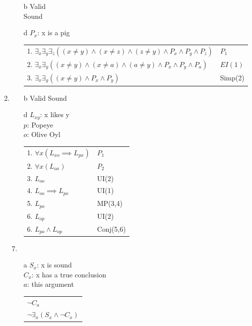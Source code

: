 \documentclass{article}
\begin{document}
\begin{enumerate}
			\begin{enumerate}
				\item[b]
					Valid\\
					Sound
				\item[d]
					$P_x$: x is a pig\\
					\begin{tabular}{l l}
						1. $\exists _x \exists _y \exists _z ((x \neq y)\land(x \neq z)\land(z \neq y)\land P_x \land P_y \land P_z)$ & $P_1$\\
						2. $\exists _x \exists _y ((x \neq y) \land (x \neq a) \land (a \neq y) \land P_x \land P_y \land P_a)$ & $EI(1)$\\
						3. $\exists _x \exists _y ((x \neq y)\land P_x \land P_y)$ & Simp(2)\\
					\end{tabular}
			\end{enumerate}
		\item
			\begin{enumerate}
				\item[b]
					Valid
					Sound
				\item[d]
					$L_{xy}$: x likes y\\
					$p$: Popeye\\
					$o$: Olive Oyl\\
					\begin{tabular}{l l}
						1. $\forall x (L_{xo} \implies L_{px})$ & $P_1$\\
						2. $\forall x (L_{ox})$ & $P_2$\\
						3. $L_{oo}$ & UI(2)\\
						4. $L_{oo} \implies L_{po}$ & UI(1)\\
						5. $L_{po}$ & MP(3,4)\\
						6. $L_{op}$ & UI(2)\\
						6. $L_{po} \land L_{op}$ & Conj(5,6)\\
					\end{tabular}
			\end{enumerate}
		\item[7.]
			\begin{enumerate}
				\item[a]
					$S_x$: x is sound\\
					$C_x$: x has a true conclusion\\
					$a$: this argument\\
					\begin{tabular}{l}
						$\lnot C_a$\\
						$\lnot \exists _x (S_x \land \lnot C_x)$\\ \hline

\end{tabular}
\end{enumerate}
\end{enumerate}
\end{document}
